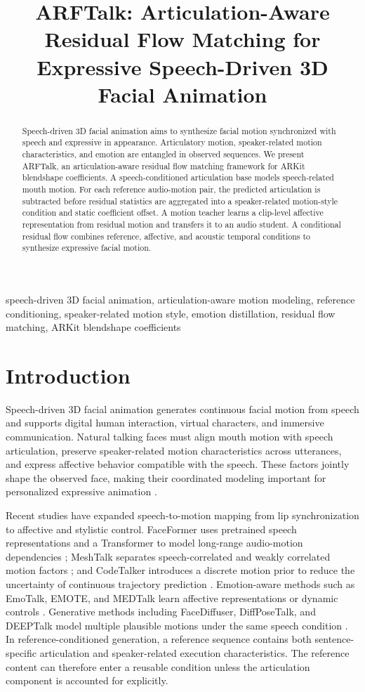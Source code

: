 \documentclass[conference]{IEEEtran}
\title{ARFTalk: Articulation-Aware Residual Flow Matching for Expressive Speech-Driven 3D Facial Animation}
\author{\IEEEauthorblockN{Author Name}\IEEEauthorblockA{Department or Institution\\City, Country\\author@example.com}}
\begin{document}
\maketitle
\begin{abstract}
Speech-driven 3D facial animation aims to synthesize facial motion synchronized with speech and expressive in appearance. Articulatory motion, speaker-related motion characteristics, and emotion are entangled in observed sequences. We present ARFTalk, an articulation-aware residual flow matching framework for ARKit blendshape coefficients. A speech-conditioned articulation base models speech-related mouth motion. For each reference audio-motion pair, the predicted articulation is subtracted before residual statistics are aggregated into a speaker-related motion-style condition and static coefficient offset. A motion teacher learns a clip-level affective representation from residual motion and transfers it to an audio student. A conditional residual flow combines reference, affective, and acoustic temporal conditions to synthesize expressive facial motion.
\end{abstract}
\begin{IEEEkeywords}
speech-driven 3D facial animation, articulation-aware motion modeling, reference conditioning, speaker-related motion style, emotion distillation, residual flow matching, ARKit blendshape coefficients
\end{IEEEkeywords}
\section{Introduction}
Speech-driven 3D facial animation generates continuous facial motion from speech and supports digital human interaction, virtual characters, and immersive communication. Natural talking faces must align mouth motion with speech articulation, preserve speaker-related motion characteristics across utterances, and express affective behavior compatible with the speech. These factors jointly shape the observed face, making their coordinated modeling important for personalized expressive animation \cite{voca,meshtalk,faceformer}.

Recent studies have expanded speech-to-motion mapping from lip synchronization to affective and stylistic control. FaceFormer uses pretrained speech representations and a Transformer to model long-range audio-motion dependencies \cite{faceformer}; MeshTalk separates speech-correlated and weakly correlated motion factors \cite{meshtalk}; and CodeTalker introduces a discrete motion prior to reduce the uncertainty of continuous trajectory prediction \cite{codetalker}. Emotion-aware methods such as EmoTalk, EMOTE, and MEDTalk learn affective representations or dynamic controls \cite{emotalk,emote,medtalk}. Generative methods including FaceDiffuser, DiffPoseTalk, and DEEPTalk model multiple plausible motions under the same speech condition \cite{facediffuser,diffposetalk,deeptalk}. In reference-conditioned generation, a reference sequence contains both sentence-specific articulation and speaker-related execution characteristics. The reference content can therefore enter a reusable condition unless the articulation component is accounted for explicitly.
\end{document}
